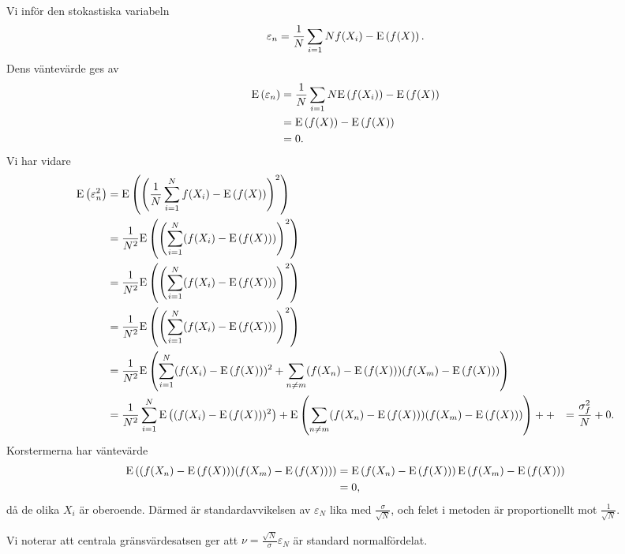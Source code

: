 Vi inför den stokastiska variabeln
\begin{align*}
	\varepsilon_{n} = \frac{1}{N}\sum\limits_{i = 1}{N}f(X_{i}) - \text{E}\left(f(X)\right).
\end{align*}
Dens väntevärde ges av
\begin{align*}
	\text{E}\left(\varepsilon_{n}\right) &= \frac{1}{N}\sum\limits_{i = 1}{N}\text{E}\left(f(X_{i})\right) - \text{E}\left(f(X)\right) \\
	                         &= \text{E}\left(f(X)\right) - \text{E}\left(f(X)\right) \\
	                         &= 0.
\end{align*}
Vi har vidare
\begin{align*}
	\text{E}\left(\varepsilon_{n}^{2}\right) &= \text{E}\left(\left(\frac{1}{N}\sum\limits_{i = 1}^{N}f(X_{i}) - \text{E}\left(f(X)\right)\right)^{2}\right) \\
	                         &= \frac{1}{N^{2}}\text{E}\left(\left(\sum\limits_{i = 1}^{N}(f(X_{i}) - \text{E}\left(f(X)\right))\right)^{2}\right) \\
	                         &= \frac{1}{N^{2}}\text{E}\left(\left(\sum\limits_{i = 1}^{N}(f(X_{i}) - \text{E}\left(f(X)\right))\right)^{2}\right) \\
	                         &= \frac{1}{N^{2}}\text{E}\left(\left(\sum\limits_{i = 1}^{N}(f(X_{i}) - \text{E}\left(f(X)\right))\right)^{2}\right) \\
	                         &= \frac{1}{N^{2}}\text{E}\left(\sum\limits_{i = 1}^{N}(f(X_{i}) - \text{E}\left(f(X)\right))^{2} + \sum\limits_{n\neq m}(f(X_{n}) - \text{E}\left(f(X)\right))(f(X_{m}) - \text{E}\left(f(X)\right))\right) \\
	                         &= \frac{1}{N^{2}}\sum\limits_{i = 1}^{N}\text{E}\left((f(X_{i}) - \text{E}\left(f(X)\right))^{2}\right) + \text{E}\left(\sum\limits_{n\neq m}(f(X_{n}) - \text{E}\left(f(X)\right))(f(X_{m}) - \text{E}\left(f(X)\right))\right) ++
	                         &= \frac{\sigma_{f}^{2}}{N} + 0.
\end{align*}
Korstermerna har väntevärde
\begin{align*}
	\text{E}\left((f(X_{n}) - \text{E}\left(f(X)\right))(f(X_{m}) - \text{E}\left(f(X)\right))\right) &= \text{E}\left(f(X_{n}) - \text{E}\left(f(X)\right)\right)\text{E}\left(f(X_{m}) - \text{E}\left(f(X)\right)\right) \\
	                                                           &= 0,
\end{align*}
då de olika $X_{i}$ är oberoende. Därmed är standardavvikelsen av $\varepsilon_{N}$ lika med $\frac{\sigma}{\sqrt{N}}$, och felet i metoden är proportionellt mot $\frac{1}{\sqrt{N}}$.

Vi noterar att centrala gränsvärdesatsen ger att $\nu = \frac{\sqrt{N}}{\sigma}\varepsilon_{N}$ är standard normalfördelat.